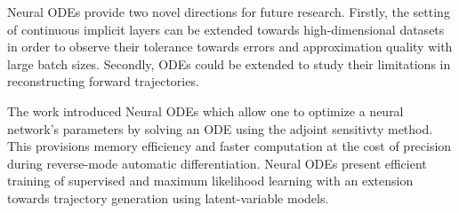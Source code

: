 \documentclass[11pt,letterpaper]{article}
\begin{document}
Neural ODEs provide two novel directions for future research. Firstly, the setting of continuous implicit layers can be extended towards high-dimensional datasets in order to observe their tolerance towards errors and approximation quality with large batch sizes. Secondly, ODEs could be extended to study their limitations in reconstructing forward trajectories. 

The work introduced Neural ODEs which allow one to optimize a neural network's parameters by solving an ODE using the adjoint sensitivty method. This provisions memory efficiency and faster computation at the cost of precision during reverse-mode automatic differentiation. Neural ODEs present efficient training of supervised and maximum likelihood learning with an extension towards trajectory generation using latent-variable models. 
\end{document}
